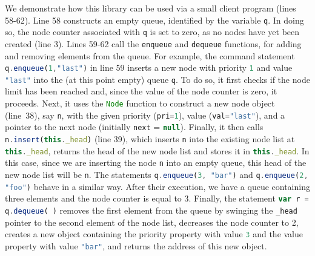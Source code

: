 \documentclass{llncs}
\def\jsinline{\lstinline[language=JavaScript, basicstyle=\small]}
\newif\ifComments
\newcommand{\pg}[1]{%
\ifComments
\begin{center}
\fbox{%
\begin{minipage}{\textwidth} \color{red}
{\bf PG:} {\rm #1}
\end{minipage}
}
\end{center}
\fi
}
\begin{document}



We demonstrate how this library  can be used via a small client program (lines 58-62).
Line 58 constructs an empty queue, identified by the variable \jsinline|q|. 
In doing so, the node counter associated with \jsinline|q| is set to zero, as no nodes have yet been created (line 3).
Lines 59-62 call the \jsinline|enqueue| and \jsinline|dequeue|
functions, for adding and removing elements from the queue. 
For example, the command statement  \jsinline|q.enqueue(1,"last")| in line 59 inserts a new node with priority \jsinline|1| and value \jsinline|"last"| into the (at this point empty) queue \jsinline|q|. To do so, it first checks if the node limit has been reached and, since the value of the node counter is zero, it proceeds. Next, it uses the \jsinline|Node| function to construct a new node object (line~38), say \jsinline|n|, with the given priority (\jsinline|pri=1|), value (\jsinline|val="last"|), and a pointer to the next node (initially \jsinline|next| = \jsinline|null|). 
Finally, it then calls \jsinline|n.insert(this._head)| (line 39), which inserts
\jsinline|n| into the existing node list at \jsinline|this._head|,
returns the head of the new node list and stores it in
\jsinline|this._head|. In this case, since we are inserting the node
\jsinline|n| into an empty queue, this head of the new node list will be
\jsinline|n|. 
The statements \jsinline|q.enqueue(3, "bar")| and \jsinline|q.enqueue(2, "foo")| behave in a similar way. After their execution, we have a queue containing three elements and the node counter is equal to 3.
Finally, the statement \jsinline|var r = q.dequeue( )| removes the first element from the queue by swinging the \jsinline|_head| pointer to the second element of the node list, decreases the node counter to 2, creates a new object containing the priority property with value \jsinline|3| and the value property with value \jsinline|"bar"|, and returns the address of this new object. 
\end{document}
